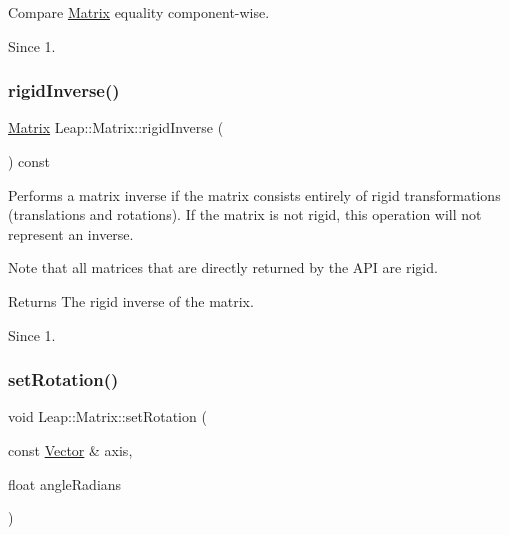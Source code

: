 Compare \hyperlink{struct_leap_1_1_matrix}{Matrix} equality component-\/wise.


\begin{DoxyCodeInclude}
\end{DoxyCodeInclude}


\begin{DoxySince}{Since}
1. 
\end{DoxySince}
\mbox{\label{struct_leap_1_1_matrix_a7fe723887951b2f2259c3e35fb217187}} 
\subsubsection{\texorpdfstring{rigid\+Inverse()}{rigidInverse()}}
{\footnotesize\ttfamily \hyperlink{struct_leap_1_1_matrix}{Matrix} Leap\+::\+Matrix\+::rigid\+Inverse (\begin{DoxyParamCaption}{ }\end{DoxyParamCaption}) const\hspace{0.3cm}{\ttfamily [inline]}}

Performs a matrix inverse if the matrix consists entirely of rigid transformations (translations and rotations). If the matrix is not rigid, this operation will not represent an inverse.


\begin{DoxyCodeInclude}
\end{DoxyCodeInclude}


Note that all matrices that are directly returned by the A\+PI are rigid.

\begin{DoxyReturn}{Returns}
The rigid inverse of the matrix. 
\end{DoxyReturn}
\begin{DoxySince}{Since}
1. 
\end{DoxySince}
\mbox{\label{struct_leap_1_1_matrix_ac48ea6588487ef4be20a31a663f58be6}} 
\subsubsection{\texorpdfstring{set\+Rotation()}{setRotation()}}
{\footnotesize\ttfamily void Leap\+::\+Matrix\+::set\+Rotation (\begin{DoxyParamCaption}\item[{const \hyperlink{struct_leap_1_1_vector}{Vector} \&}]{axis,  }\item[{float}]{angle\+Radians }\end{DoxyParamCaption})\hspace{0.3cm}{\ttfamily [inline]}}

